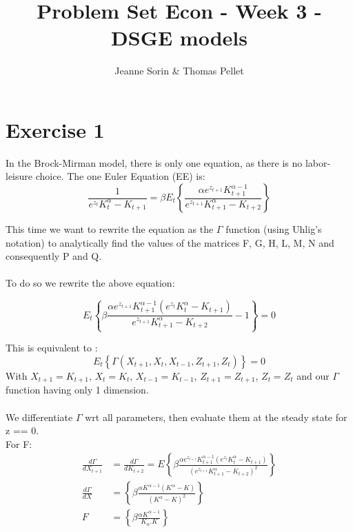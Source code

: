 \documentclass[11pt]{article}
\title{Problem Set Econ - Week 3 - DSGE models}
\author{Jeanne Sorin \& Thomas Pellet}
\numberwithin{equation}{section}
\theoremstyle{plain}
\theoremstyle{definition}
\newcommand{\1}{\mathbbm 1}
\def\a{\alpha}
\def\b{\beta}
\begin{document}
\maketitle



\section*{Exercise 1}
In the Brock-Mirman model, there is only one equation, as there is no labor-leisure choice. The one Euler Equation (EE) is:
\begin{equation}
\frac{1}{e^{z_{t}} K_{t}^{\alpha}-K_{t+1}}=\beta E_{t}\left\{\frac{\alpha e^{z_{t+1}} K_{t+1}^{\alpha-1}}{e^{z_{t+1}} K_{t+1}^{\alpha}-K_{t+2}}\right\}
\end{equation}

This time we want to rewrite the equation as the $\Gamma$ function (using Uhlig's notation) to analytically find the values of the matrices F, G, H, L, M, N and consequently P and Q.
\\
\\
To do so we rewrite the above equation:

\begin{equation}
	E_t \left\{\b \frac{ \a e^{z_{t+1}} K_{t+1}^{\a - 1} (e^{z_t} K_t ^\a -K_{t+1})}{e^{z_{t+1}}K_{t+1}^{\a} - K_{t+2}} -1 \right\}= 0
\end{equation}

This is equivalent to :
\begin{equation}
	E_t \left\{\Gamma (X_{t+1}, X_t, X_{t-1}, Z_{t+1}, Z_t) \right\} = 0
\end{equation}
With $X_{t+1} = K_{t+1}$, $X_{t} = K_{t}$, $X_{t-1} = K_{t-1}$, $Z_{t+1} = Z_{t+1}$, $Z_{t} = Z_{t}$ and our $\Gamma$ function having only 1 dimension.
\\
\\
We differentiate $\Gamma$ wrt all parameters, then evaluate them at the steady state for z == 0. \\
For F:
\begin{align}
	\frac{d\Gamma}{d X_{t+1}} &= \frac{d\Gamma}{d K_{t+2}} = E \left\{\b \frac{\a e^{z_{t+1}} K_{t+1}^{\a - 1} (e^{z_t} K_t ^\a -K_{t+1})}{(e^{z_{t+1}}K_{t+1}^{\a} - K_{t+2})^2}
	\right\} \\
	\frac{d\Gamma}{d X} &= \left\{\b \frac{\a K^{\a - 1} (K ^\a -K)}{(K^{\a} - K)^2}
	\right\} \\
	F &=  \left\{\b \frac{\a K^{\a - 1}}{K_\a. K} \right\}
\end{align}
\end{document}
